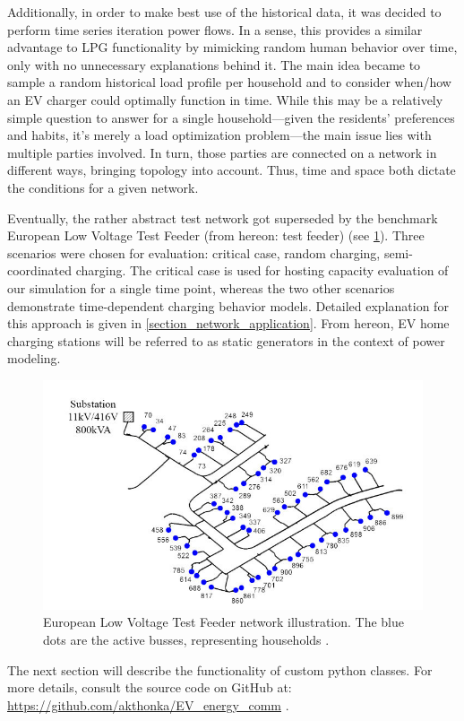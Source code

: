 \documentclass[a4paper,10pt]{report}
\begin{document}
Additionally, in order to make best use of the historical data, it was decided to perform time series iteration power flows. In a sense, this provides a similar advantage to LPG functionality by mimicking random human behavior over time, only with no unnecessary explanations behind it. The main idea became to sample a random historical load profile per household and to consider when/how an EV charger could optimally function in time. While this may be a relatively simple question to answer for a single household---given the residents' preferences and habits, it's merely a load optimization problem---the main issue lies with multiple parties involved. In turn, those parties are connected on a network in different ways, bringing topology into account. Thus, time and space both dictate the conditions for a given network.

Eventually, the rather abstract test network got superseded by the benchmark European Low Voltage Test Feeder (from hereon: test feeder) (see \cref{EU_LV_test_feeder}). Three scenarios were chosen for evaluation: critical case, random charging, semi-coordinated charging. The critical case is used for hosting capacity evaluation of our simulation for a single time point, whereas the two other scenarios demonstrate time-dependent charging behavior models. Detailed explanation for this approach is given in \cref{section_network_application}. From hereon, EV home charging stations will be referred to as static generators in the context of power modeling.

\FloatBarrier
\begin{figure}[htpb]
	\centering
	\includegraphics[width=0.7\linewidth]{EU_LV_test_feeder}
	\caption{European Low Voltage Test Feeder network illustration. The blue dots are the active busses, representing households \cite{Nousdilis2017}.}
	\label{EU_LV_test_feeder}
\end{figure}
\FloatBarrier

The next section will describe the functionality of custom python classes. For more details, consult the source code on GitHub at: \url{https://github.com/akthonka/EV_energy_comm} .
\end{document}
